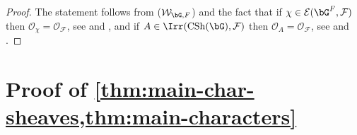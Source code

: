 \documentclass[eqthmnum,nocolour,skinny]{jt-calcs}
\DeclareMathOperator{\CS}{CSh}
\begin{document}
\begin{proof}
The statement follows from ($\mathcal{W}_{\bG,F}$) and the fact that if $\chi \in \mathcal{E}(\bG^F,\mathcal{F})$ then $\mathcal{O}_{\chi} = \mathcal{O_F}$, see \cite[11.2]{lusztig:1992:a-unipotent-support} and \cite[\S3.C]{geck-malle:2000:existence-of-a-unipotent-support}, and if $A \in \Irr(\CS(\bG),\mathcal{F})$ then $\mathcal{O}_A = \mathcal{O_F}$, see \cite[10.7]{lusztig:1992:a-unipotent-support} and \cite[13.8]{taylor:2016:GGGRs-small-characteristics}.
\end{proof}


\section{Proof of \texorpdfstring{\cref{thm:main-char-sheaves,thm:main-characters}}{main theorems}}\label{sec:proof-of-closure}
\end{document}
